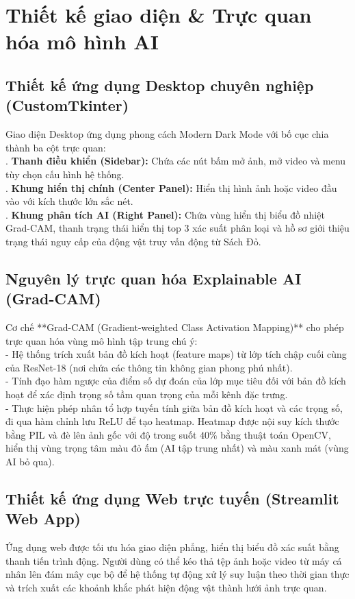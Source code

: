\documentclass[12pt,a4paper]{report}
\begin{document}
\chapter{Thiết kế giao diện & Trực quan hóa mô hình AI}

\section{Thiết kế ứng dụng Desktop chuyên nghiệp (CustomTkinter)}
Giao diện Desktop ứng dụng phong cách Modern Dark Mode với bố cục chia thành ba cột trực quan:\\

. \textbf{Thanh điều khiển (Sidebar):} Chứa các nút bấm mở ảnh, mở video và menu tùy chọn cấu hình hệ thống.\\[0.15cm]
. \textbf{Khung hiển thị chính (Center Panel):} Hiển thị hình ảnh hoặc video đầu vào với kích thước lớn sắc nét.\\[0.15cm]
. \textbf{Khung phân tích AI (Right Panel):} Chứa vùng hiển thị biểu đồ nhiệt Grad-CAM, thanh trạng thái hiển thị top 3 xác suất phân loại và hồ sơ giới thiệu trạng thái nguy cấp của động vật truy vấn động từ Sách Đỏ.

\section{Nguyên lý trực quan hóa Explainable AI (Grad-CAM)}
Cơ chế **Grad-CAM (Gradient-weighted Class Activation Mapping)** cho phép trực quan hóa vùng mô hình tập trung chú ý:\\

\noindent - Hệ thống trích xuất bản đồ kích hoạt (feature maps) từ lớp tích chập cuối cùng của ResNet-18 (nơi chứa các thông tin không gian phong phú nhất).\\[0.15cm]
\noindent - Tính đạo hàm ngược của điểm số dự đoán của lớp mục tiêu đối với bản đồ kích hoạt để xác định trọng số tầm quan trọng của mỗi kênh đặc trưng.\\[0.15cm]
\noindent - Thực hiện phép nhân tổ hợp tuyến tính giữa bản đồ kích hoạt và các trọng số, đi qua hàm chỉnh lưu ReLU để tạo heatmap. Heatmap được nội suy kích thước bằng PIL và đè lên ảnh gốc với độ trong suốt $40\%$ bằng thuật toán OpenCV, hiển thị vùng trọng tâm màu đỏ ấm (AI tập trung nhất) và màu xanh mát (vùng AI bỏ qua).

\section{Thiết kế ứng dụng Web trực tuyến (Streamlit Web App)}
Ứng dụng web được tối ưu hóa giao diện phẳng, hiển thị biểu đồ xác suất bằng thanh tiến trình động. Người dùng có thể kéo thả tệp ảnh hoặc video từ máy cá nhân lên đám mây cục bộ để hệ thống tự động xử lý suy luận theo thời gian thực và trích xuất các khoảnh khắc phát hiện động vật thành lưới ảnh trực quan.
\newpage
\end{document}
